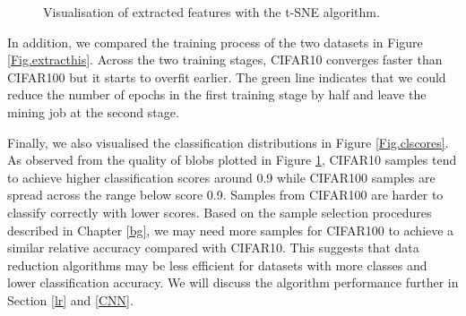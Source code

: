 \begin{figure}[H]
\centering  
{}
\caption{Visualisation of extracted features with the t-SNE algorithm.}
\label{Fig.tsne}
\end{figure}

In addition, we compared the training process of the two datasets in Figure \ref{Fig.extracthis}. Across the two training stages, CIFAR10 converges faster than CIFAR100 but it starts to overfit earlier. The green line indicates that we could reduce the number of epochs in the first training stage by half and leave the mining job at the second  stage. 

Finally, we also visualised the classification distributions in Figure \ref{Fig.clscores}. As observed from the quality of blobs plotted in Figure \ref{Fig.tsne}, CIFAR10 samples tend to achieve higher classification scores around 0.9 while CIFAR100 samples are spread across the range below score 0.9. Samples from CIFAR100 are harder to classify correctly with lower scores. Based on the sample selection procedures described in Chapter \ref{bg}, we may need more samples for CIFAR100 to achieve a similar relative accuracy compared with CIFAR10. This suggests that data reduction algorithms may be less efficient for datasets with more classes and lower classification accuracy. We will discuss the algorithm performance further in Section \ref{lr} and \ref{CNN}. 

